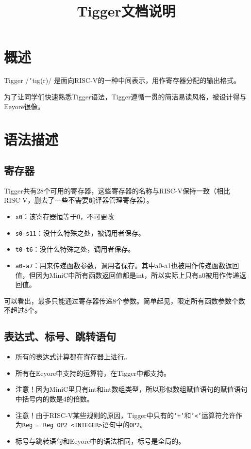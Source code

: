 \documentclass{ctexart}
\title{Tigger文档说明}
\date{}
\author{}
\begin{document}
\maketitle
\section{概述}
Tigger /\texttt{'}t\i g\textschwa (r)/ 是面向RISC-V的一种中间表示，用作寄存器分配的输出格式。

为了让同学们快速熟悉Tigger语法，Tigger遵循一贯的简洁易读风格，被设计得与Eeyore很像。



\section{语法描述}
\subsection{寄存器}
Tigger共有28个可用的寄存器，这些寄存器的名称与RISC-V保持一致（相比RISC-V，删去了一些不需要编译器管理寄存器）。
\begin{itemize}
\item
\texttt{x0}：该寄存器恒等于0，不可更改

\item
\texttt{s0-s11}：没什么特殊之处，被调用者保存。

\item
\texttt{t0-t6}：没什么特殊之处，调用者保存。

\item
\texttt{a0-a7}：用来传递函数参数，调用者保存。其中a0-a1也被用作传递函数返回值，但因为MiniC中所有函数返回值都是int，所以实际上只有a0被用作传递返回值。
\end{itemize}
可以看出，最多只能通过寄存器传递8个参数。简单起见，限定所有函数参数个数不超过8个。

\subsection{表达式、标号、跳转语句}
\begin{itemize}
\item
所有的表达式计算都在寄存器上进行。

\item
所有在Eeyore中支持的运算符，在Tigger中都支持。

\item
注意！因为MiniC里只有int和int数组类型，所以形似数组赋值语句的赋值语句中括号内的数是4的倍数。

\item
注意！由于RISC-V某些规则的原因，Tigger中只有的\texttt{'+'}和\texttt{'<'}运算符允许作为\texttt{Reg = Reg OP2 <INTEGER>}语句中的\texttt{OP2}。

\item
标号与跳转语句和Eeyore中的语法相同，标号是全局的。
\end{itemize}
\end{document}
